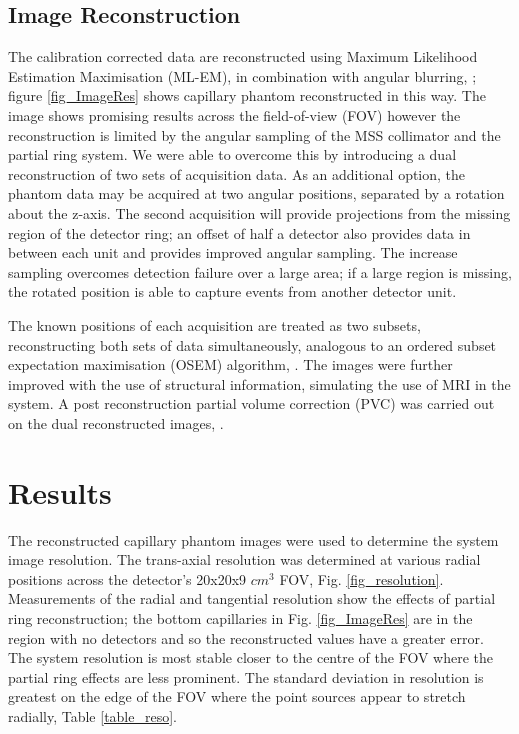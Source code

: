 \subsection{Image Reconstruction}

The calibration corrected data are reconstructed using Maximum Likelihood Estimation Maximisation (ML-EM), \cite{4307558} in combination with angular blurring, \cite{bousse2013angular}; figure \ref{fig_ImageRes} shows capillary phantom reconstructed in this way. The image shows promising results across the field-of-view (FOV) however the reconstruction is limited by the angular sampling of the MSS collimator and the partial ring system. We were able to overcome this by introducing a dual reconstruction of two sets of acquisition data. As an additional option, the phantom data may be acquired at two angular positions, separated by a rotation about the z-axis. The second acquisition will provide projections from the missing region of the detector ring; an offset of half a detector also provides data in between each unit and provides improved angular sampling. The increase sampling overcomes detection failure over a large area; if a large region is missing, the rotated position is able to capture events from another detector unit. 

The known positions of each acquisition are treated as two subsets, reconstructing both sets of data simultaneously, analogous to an ordered subset expectation maximisation (OSEM) algorithm, \cite{363108}. The images were further improved with the use of structural information, simulating the use of MRI in the system. A post reconstruction partial volume correction (PVC) was carried out on the dual reconstructed images, \cite{Erlandsson_2012}.


\section{Results}
 The reconstructed capillary phantom images were used to determine the system image resolution. The trans-axial resolution was determined at various radial positions across the detector's 20x20x9 $cm^3$ FOV, Fig. \ref{fig_resolution}. Measurements of the radial and tangential resolution show the effects of partial ring reconstruction; the bottom capillaries in Fig. \ref{fig_ImageRes} are in the region with no detectors and so the reconstructed values have a greater error. The system resolution is most stable closer to the centre of the FOV where the partial ring effects are less prominent. The standard deviation in resolution is greatest on the edge of the FOV where the point sources appear to stretch radially, Table \ref{table_reso}.
 
